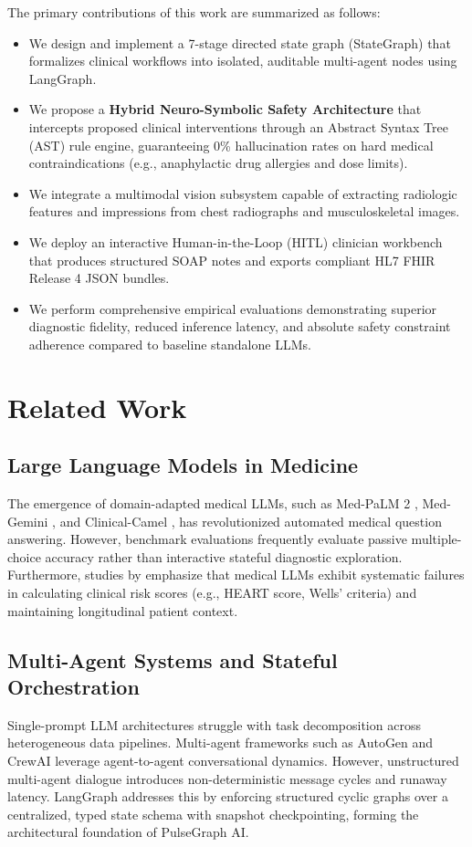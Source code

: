 \documentclass[conference]{IEEEtran}
\begin{document}
The primary contributions of this work are summarized as follows:
\begin{itemize}
    \item We design and implement a 7-stage directed state graph (StateGraph) that formalizes clinical workflows into isolated, auditable multi-agent nodes using LangGraph.
    \item We propose a \textbf{Hybrid Neuro-Symbolic Safety Architecture} that intercepts proposed clinical interventions through an Abstract Syntax Tree (AST) rule engine, guaranteeing 0\% hallucination rates on hard medical contraindications (e.g., anaphylactic drug allergies and dose limits).
    \item We integrate a multimodal vision subsystem capable of extracting radiologic features and impressions from chest radiographs and musculoskeletal images.
    \item We deploy an interactive Human-in-the-Loop (HITL) clinician workbench that produces structured SOAP notes and exports compliant HL7 FHIR Release 4 JSON bundles.
    \item We perform comprehensive empirical evaluations demonstrating superior diagnostic fidelity, reduced inference latency, and absolute safety constraint adherence compared to baseline standalone LLMs.
\end{itemize}

\section{Related Work}

\subsection{Large Language Models in Medicine}
The emergence of domain-adapted medical LLMs, such as Med-PaLM 2 \cite{singhal2023large}, Med-Gemini \cite{saab2024capabilities}, and Clinical-Camel \cite{toma2023clinical}, has revolutionized automated medical question answering. However, benchmark evaluations frequently evaluate passive multiple-choice accuracy rather than interactive stateful diagnostic exploration. Furthermore, studies by \cite{cohen2023hallucinations} emphasize that medical LLMs exhibit systematic failures in calculating clinical risk scores (e.g., HEART score, Wells' criteria) and maintaining longitudinal patient context.

\subsection{Multi-Agent Systems and Stateful Orchestration}
Single-prompt LLM architectures struggle with task decomposition across heterogeneous data pipelines. Multi-agent frameworks such as AutoGen \cite{wu2023autogen} and CrewAI \cite{crewai2024} leverage agent-to-agent conversational dynamics. However, unstructured multi-agent dialogue introduces non-deterministic message cycles and runaway latency. LangGraph \cite{langgraph2024} addresses this by enforcing structured cyclic graphs over a centralized, typed state schema with snapshot checkpointing, forming the architectural foundation of PulseGraph AI.
\end{document}
